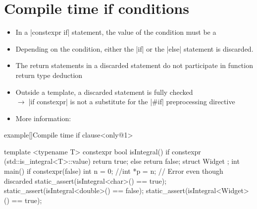 \section{Compile time if conditions}
\begin{frame}[fragile]{\insertsectionhead}
    \vspace{-3mm}
    \begin{itemize}
        \item In a \CPP|constexpr if| statement, the value of the condition must be a  
        \item  Depending on the condition, either the \CPP|if| or the \CPP|else| statement is discarded.
        \item The return statements in a discarded statement do not participate in function return type deduction
        \item Outside a template, a discarded statement is fully checked\\
              {\footnotesize$\to\;$\CPP|if constexpr| is not a substitute for the \CPP|#if| preprocessing directive}
        \item More information: 
    \end{itemize}
\end{frame}
\begin{frame}[fragile]{}
    \begin{varblock}{example}[\textwidth]{Compile time if clause}<only@1>
        \begin{Cpp}
            template <typename T>
            constexpr bool isIntegral() {
                if constexpr (std::is_integral<T>::value) {
                    return true;
                } else {
                    return false;
                }
            }
            struct Widget {};
            int main(){
                if constexpr(false) {
                    int n = 0;
                    //int *p = n; // Error even though discarded
                }
                static_assert(isIntegral<char>() == true);
                static_assert(isIntegral<double>() == false);
                static_assert(isIntegral<Widget>() == true);
            }
        \end{Cpp}
    \end{varblock}
\end{frame}

